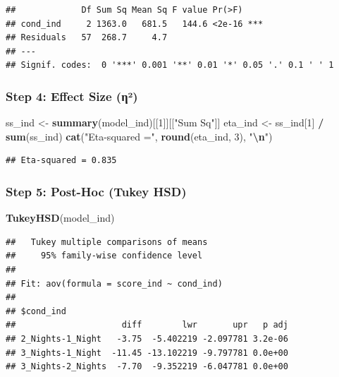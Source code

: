 \documentclass[
]{article}
\newenvironment{Shaded}{\begin{snugshade}}{\end{snugshade}}
\newcommand{\DecValTok}[1]{\textcolor[rgb]{0.00,0.00,0.81}{#1}}
\newcommand{\FunctionTok}[1]{\textcolor[rgb]{0.13,0.29,0.53}{\textbf{#1}}}
\newcommand{\NormalTok}[1]{#1}
\newcommand{\OtherTok}[1]{\textcolor[rgb]{0.56,0.35,0.01}{#1}}
\newcommand{\SpecialCharTok}[1]{\textcolor[rgb]{0.81,0.36,0.00}{\textbf{#1}}}
\newcommand{\StringTok}[1]{\textcolor[rgb]{0.31,0.60,0.02}{#1}}
\begin{document}
\begin{verbatim}
##             Df Sum Sq Mean Sq F value Pr(>F)    
## cond_ind     2 1363.0   681.5   144.6 <2e-16 ***
## Residuals   57  268.7     4.7                   
## ---
## Signif. codes:  0 '***' 0.001 '**' 0.01 '*' 0.05 '.' 0.1 ' ' 1
\end{verbatim}

\subsubsection{Step 4: Effect Size
(η²)}\label{step-4-effect-size-ux3b7uxb2}

\begin{Shaded}
\begin{Highlighting}[]
\NormalTok{ss\_ind  }\OtherTok{\textless{}{-}} \FunctionTok{summary}\NormalTok{(model\_ind)[[}\DecValTok{1}\NormalTok{]][[}\StringTok{"Sum Sq"}\NormalTok{]]}
\NormalTok{eta\_ind }\OtherTok{\textless{}{-}}\NormalTok{ ss\_ind[}\DecValTok{1}\NormalTok{] }\SpecialCharTok{/} \FunctionTok{sum}\NormalTok{(ss\_ind)}
\FunctionTok{cat}\NormalTok{(}\StringTok{"Eta{-}squared ="}\NormalTok{, }\FunctionTok{round}\NormalTok{(eta\_ind, }\DecValTok{3}\NormalTok{), }\StringTok{"}\SpecialCharTok{\textbackslash{}n}\StringTok{"}\NormalTok{)}
\end{Highlighting}
\end{Shaded}

\begin{verbatim}
## Eta-squared = 0.835
\end{verbatim}

\subsubsection{Step 5: Post-Hoc (Tukey
HSD)}\label{step-5-post-hoc-tukey-hsd}

\begin{Shaded}
\begin{Highlighting}[]
\FunctionTok{TukeyHSD}\NormalTok{(model\_ind)}
\end{Highlighting}
\end{Shaded}

\begin{verbatim}
##   Tukey multiple comparisons of means
##     95% family-wise confidence level
## 
## Fit: aov(formula = score_ind ~ cond_ind)
## 
## $cond_ind
##                     diff        lwr       upr   p adj
## 2_Nights-1_Night   -3.75  -5.402219 -2.097781 3.2e-06
## 3_Nights-1_Night  -11.45 -13.102219 -9.797781 0.0e+00
## 3_Nights-2_Nights  -7.70  -9.352219 -6.047781 0.0e+00
\end{verbatim}
\end{document}
